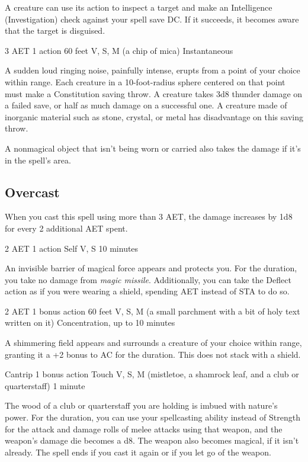 A creature can use its action to inspect a target and make an Intelligence (Investigation) check against your spell save DC. If it succeeds, it becomes aware that the target is disguised.

{3 AET}
{1 action}
{60 feet}
{V, S, M (a chip of mica)}
{Instantaneous}

A sudden loud ringing noise, painfully intense, erupts from a point of your choice within range. Each creature in a 10-foot-radius sphere centered on that point must make a Constitution saving throw. A creature takes 3d8 thunder damage on a failed save, or half as much damage on a successful one. A creature made of inorganic material such as stone, crystal, or metal has disadvantage on this saving throw.

A nonmagical object that isn't being worn or carried also takes the damage if it's in the spell's area.

\subsection*{Overcast} When you cast this spell using more than 3 AET, the damage increases by 1d8 for every 2 additional AET spent.

{2 AET}
{1 action}
{Self}
{V, S}
{10 minutes}

An invisible barrier of magical force appears and protects you. For the duration, you take no damage from \textit{magic missile}. Additionally, you can take the Deflect action as if you were wearing a shield, spending AET instead of STA to do so.

{2 AET}
{1 bonus action}
{60 feet}
{V, S, M (a small parchment with a bit of holy text written on it)}
{Concentration, up to 10 minutes}

A shimmering field appears and surrounds a creature of your choice within range, granting it a +2 bonus to AC for the duration. This does not stack with a shield.

{Cantrip}
{1 bonus action}
{Touch}
{V, S, M (mistletoe, a shamrock leaf, and a club or quarterstaff)}
{1 minute}

The wood of a club or quarterstaff you are holding is imbued with nature's power. For the duration, you can use your spellcasting ability instead of Strength for the attack and damage rolls of melee attacks using that weapon, and the weapon's damage die becomes a d8. The weapon also becomes magical, if it isn't already. The spell ends if you cast it again or if you let go of the weapon.

